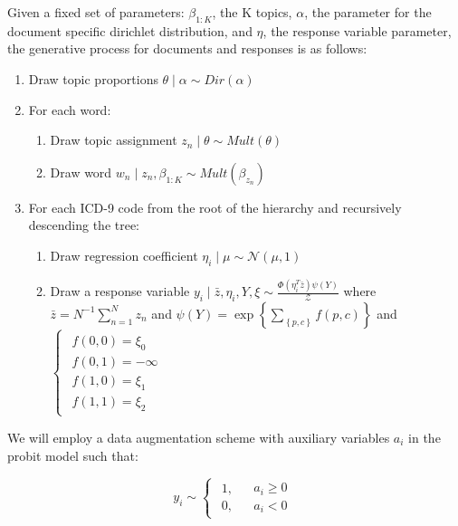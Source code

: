 \documentclass{article}
\begin{document}
Given a fixed set of parameters: $\beta_{1:K}$, the K topics, $\alpha$,
the parameter for the document specific dirichlet distribution, and
$\eta$, the response variable parameter, the generative process for
documents and responses is as follows: 
\begin{enumerate}
\item Draw topic proportions $\theta\mid\alpha\sim Dir\left(\alpha\right)$ 
\item For each word:

\begin{enumerate}
\item Draw topic assignment $z_{n}\mid\theta\sim Mult\left(\theta\right)$ 
\item Draw word $w_{n}\mid z_{n},\beta_{1:K}\sim Mult\left(\beta_{z_{n}}\right)$ 
\end{enumerate}
\item For each ICD-9 code from the root of the hierarchy and recursively
descending the tree:

\begin{enumerate}
\item Draw regression coefficient $\eta_{i}\mid\mu\sim\mathcal{N}\left(\mu,1\right)$
\item Draw a response variable $y_{i}\mid\bar{z},\eta_{i},Y,\xi\sim\frac{\Phi\left(\eta_{i}^{T}\bar{z}\right)\psi\left(Y\right)}{\mathcal{Z}}$
where $\bar{z}=N^{-1}\sum_{n=1}^{N}z_{n}$ and $\psi\left(Y\right)=\exp\left\{ \sum_{\left\{ p,c\right\} }f(p,c)\right\} $
and $\begin{cases}
\begin{array}{c}
f(0,0)=\xi_{0}\\
f(0,1)=-\infty\\
f(1,0)=\xi_{1}\\
f(1,1)=\xi_{2}\end{array}\end{cases}$
\end{enumerate}
\end{enumerate}
We will employ a data augmentation scheme with auxiliary variables
$a_{i}$ in the probit model such that:

\begin{equation}
y_{i}\sim\begin{cases}
\begin{array}{c}
1,\\
0,\end{array} & \begin{array}{c}
a_{i}\geq0\\
a_{i}<0\end{array}\end{cases}\end{equation}
\end{document}
